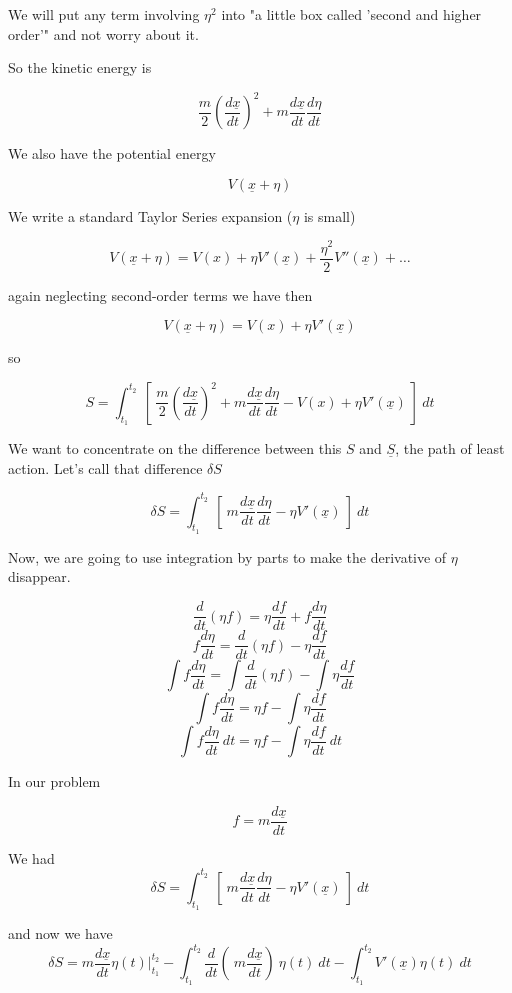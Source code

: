 \documentclass[11pt, oneside]{article}   	%
\begin{document}
We will put any term involving $\eta^2$ into "a little box called 'second and higher order'" and not worry about it.

So the kinetic energy is

\[ \frac{m}{2} (\frac{d\underline{x}}{dt})^2 + m \frac{d\underline{x}}{dt}  \frac{d\eta}{dt} \]

We also have the potential energy

\[ V(\underline{x} + \eta) \]

We write a standard Taylor Series expansion ($\eta$ is small)

\[ V(\underline{x} + \eta) = V(x) + \eta V'(\underline{x}) + \frac{\eta^2}{2} V''(\underline{x}) + \dots \]

again neglecting second-order terms we have then

\[ V(\underline{x} + \eta) = V(x) + \eta V'(\underline{x}) \]

so

\[ S =  \int_{t_1}^{t_2} \ [ \  \frac{m}{2} (\frac{d\underline{x}}{dt})^2 + m \frac{d\underline{x}}{dt}  \frac{d\eta}{dt} - V(x) + \eta V'(\underline{x})  \ ] \ dt \]

We want to concentrate on the difference between this $S$ and $\underline{S}$, the path of least action.  Let's call that difference $\delta S$

\[ \delta S =  \int_{t_1}^{t_2} \ [ \  m \frac{d\underline{x}}{dt}  \frac{d\eta}{dt} -  \eta V'(\underline{x})  \ ] \ dt \]

Now, we are going to use integration by parts to make the derivative of $\eta$ disappear.

\[ \frac{d}{dt} (\eta f) = \eta \frac{df}{dt} + f \frac{d\eta}{dt} \]
\[  f \frac{d\eta}{dt} =  \frac{d}{dt} (\eta f) - \eta \frac{df}{dt} \]
\[  \int f \frac{d\eta}{dt} =  \int \frac{d}{dt} (\eta f) - \int \eta \frac{df}{dt} \]
\[  \int f \frac{d\eta}{dt} =  \eta f - \int \eta \frac{df}{dt} \]
\[  \int f \frac{d\eta}{dt} \ dt =  \eta f - \int \eta \frac{df}{dt} \ dt \]

In our problem

\[ f = m \frac{d \underline{x}}{dt} \]

We had 
\[ \delta S =  \int_{t_1}^{t_2} \ [ \  m \frac{d\underline{x}}{dt}  \frac{d\eta}{dt} -  \eta V'(\underline{x})  \ ] \ dt \]

and now we have
\[ \delta S =  m \frac{d \underline{x}}{dt} \eta(t) \bigg |_{t_1}^{t_2} - \int_{t_1}^{t_2}  \frac{d}{dt} (\  m \frac{d\underline{x}}{dt}) \ \eta(t) \ dt  -  \int_{t_1}^{t_2}  V'(\underline{x})   \eta(t) \ dt \]
\end{document}
